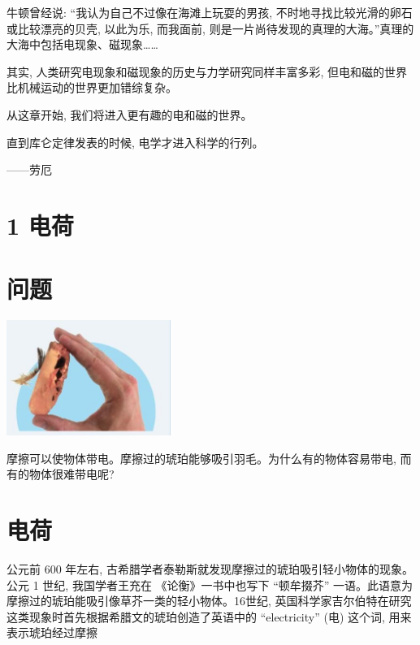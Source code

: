 \documentclass[10pt]{article}
\begin{document}
牛顿曾经说: “我认为自己不过像在海滩上玩耍的男孩, 不时地寻找比较光滑的卵石或比较漂亮的贝壳, 以此为乐, 而我面前, 则是一片尚待发现的真理的大海。”真理的大海中包括电现象、磁现象……

其实, 人类研究电现象和磁现象的历史与力学研究同样丰富多彩, 但电和磁的世界比机械运动的世界更加错综复杂。

从这章开始, 我们将进入更有趣的电和磁的世界。

直到库仑定律发表的时候, 电学才进入科学的行列。

——劳厄

\section*{1 电荷}

\section*{问题}

\begin{center}
\includegraphics[max width=0.4\textwidth]{images/01911d5f-8e38-70c0-b5b8-2b399bd115b6_7_151334.jpg}
\end{center}

摩擦可以使物体带电。摩擦过的琥珀能够吸引羽毛。为什么有的物体容易带电, 而有的物体很难带电呢?

\section*{电荷}

公元前 600 年左右, 古希腊学者泰勒斯就发现摩擦过的琥珀吸引轻小物体的现象。公元 1 世纪, 我国学者王充在 《论衡》一书中也写下 “顿牟掇芥” 一语。此语意为摩擦过的琥珀能吸引像草芥一类的轻小物体。16世纪, 英国科学家吉尔伯特在研究这类现象时首先根据希腊文的琥珀创造了英语中的 “electricity” (电) 这个词, 用来表示琥珀经过摩擦
\end{document}
